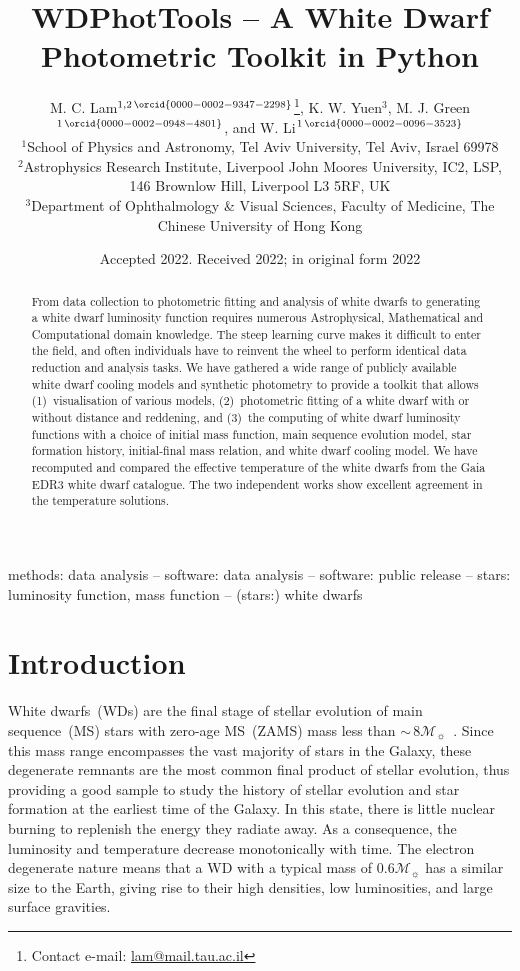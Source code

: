 \documentclass[fleqn,usenatbib]{rasti}
\title[WD Photometric Toolkit]{WDPhotTools -- A White Dwarf Photometric Toolkit in Python}
\author[M. C. Lam et al.]{
M. C. Lam$^{1, 2\,\orcid{0000-0002-9347-2298}}$\thanks{Contact e-mail: \href{mailto:lam@mail.tau.ac.il}{lam@mail.tau.ac.il}},
K. W. Yuen$^{3}$,
M. J. Green$^{1\,\orcid{0000-0002-0948-4801}}$, and
W. Li$^{1\,\orcid{0000-0002-0096-3523}}$\\
$^{1}$School of Physics and Astronomy, Tel Aviv University, Tel Aviv, Israel 69978\\
$^{2}$Astrophysics Research Institute, Liverpool John Moores University, IC2, LSP, 146 Brownlow Hill, Liverpool L3 5RF, UK\\
$^{3}$Department of Ophthalmology \& Visual Sciences, Faculty of Medicine, The Chinese University of Hong Kong
}
\date{Accepted 2022. Received 2022; in original form 2022}
\newcommand{\msun}{\mathcal{M}_{\sun}}
\begin{document}
\label{firstpage}
\pagerange{\pageref{firstpage}--\pageref{lastpage}}
\maketitle

\begin{abstract}
From data collection to photometric fitting and analysis of white dwarfs
to generating a white dwarf luminosity function requires numerous Astrophysical,
Mathematical and Computational domain knowledge. The steep learning curve makes
it difficult to enter the field, and often individuals have to reinvent the wheel
to perform identical data reduction and analysis tasks. We have gathered a wide
range of publicly available white dwarf cooling models and synthetic photometry
to provide a toolkit that allows (1)~visualisation of various models,
(2)~photometric fitting of a white dwarf with or without distance and reddening,
and (3)~the computing of white dwarf luminosity functions with a choice of
initial mass function, main sequence evolution model, star formation history,
initial-final mass relation, and white dwarf cooling model. We have recomputed
and compared the effective temperature of the white dwarfs from the Gaia EDR3
white dwarf catalogue. The two independent works show excellent agreement in
the temperature solutions.
\end{abstract}

\begin{keywords}
methods: data analysis -- software: data analysis -- software: public release -- stars: luminosity function, mass function -- (stars:) white dwarfs
\end{keywords}


\section{Introduction}
White dwarfs~(WDs) are the final stage of stellar evolution of main
sequence~(MS) stars with zero-age MS~(ZAMS) mass less than
$\sim$\,$8\msun$~\citep{2013sse..book.....K}. Since this
mass range encompasses the vast majority of stars in the Galaxy, these
degenerate remnants are the most common final product of stellar evolution,
thus providing a good sample to study the history of stellar evolution and star
formation at the earliest time of the Galaxy. In this state,
there is little nuclear burning to replenish the energy they radiate away. As a
consequence, the luminosity and temperature decrease monotonically with time.
The electron degenerate nature means that a WD with a typical mass of
$0.6\mathcal{M}_{\sun}$ has a similar size to the Earth, giving rise to their
high densities, low luminosities, and large surface gravities.
\end{document}
